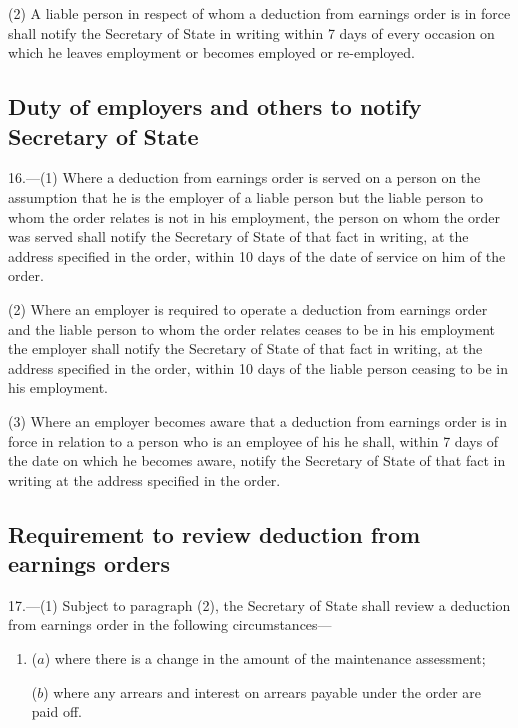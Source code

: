 \documentclass[12pt,a4paper]{article}
\begin{document}
(2) A liable person in respect of whom a deduction from earnings order is in force shall notify the Secretary of State in writing within 7 days of every occasion on which he leaves employment or becomes employed or re-employed.

\subsection[16. Duty of employers and others to notify Secretary of State]{Duty of employers and others to notify Secretary of State}

16.—(1) Where a deduction from earnings order is served on a person on the assumption that he is the employer of a liable person but the liable person to whom the order relates is not in his employment, the person on whom the order was served shall notify the Secretary of State of that fact in writing, at the address specified in the order, within 10 days of the date of service on him of the order.

(2) Where an employer is required to operate a deduction from earnings order and the liable person to whom the order relates ceases to be in his employment the employer shall notify the Secretary of State of that fact in writing, at the address specified in the order, within 10 days of the liable person ceasing to be in his employment.

(3) Where an employer becomes aware that a deduction from earnings order is in force in relation to a person who is an employee of his he shall, within 7 days of the date on which he becomes aware, notify the Secretary of State of that fact in writing at the address specified in the order.

\subsection[17. Requirement to review deduction from earnings orders]{Requirement to review deduction from earnings orders}

%

17.—(1) Subject to paragraph (2), the Secretary of State shall review a deduction from earnings order in the following circumstances—
\begin{enumerate}\item[]
($a$) where there is a change in the amount of the maintenance assessment;

($b$) where any arrears and interest on arrears payable under the order are paid off.
\end{enumerate}
\end{document}
